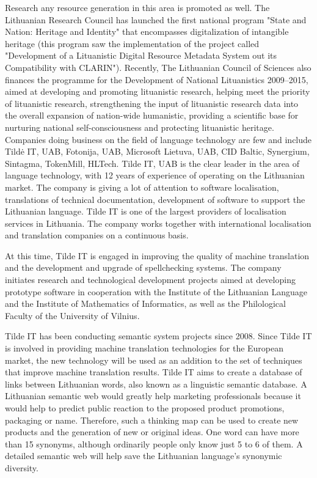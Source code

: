 \documentclass[]{../metanetpaper}
\begin{document}
\begin{multicols}{2}
Research any resource generation in this area is promoted as well. The Lithuanian Research Council has launched the first national program "State and Nation: Heritage and Identity" that encompasses digitalization of intangible heritage (this program saw the implementation of the project called "Development of a Lituanistic Digital Resource Metadata System out its Compatibility with CLARIN"). Recently, The Lithuanian Council of Sciences also finances the programme for the Development of National Lituanistics 2009–2015, aimed at developing and promoting lituanistic research, helping meet the priority of lituanistic research, strengthening the input of lituanistic research data into the overall expansion of nation-wide humanistic, providing a scientific base for nurturing national self-consciousness and protecting lituanistic heritage.
Companies doing business on the field of language technology are few and include Tildė IT, UAB, Fotonija, UAB, Microsoft Lietuva, UAB, CID Baltic, Synergium, Sintagma, TokenMill, HLTech.
Tilde IT, UAB is the clear leader in the area of language technology, with 12 years of experience of operating on the Lithuanian market.
The company is giving a lot of attention to software localisation, translations of technical documentation, development of software to support the Lithuanian language. Tilde IT is one of the largest providers of localisation services in Lithuania. The company works together with international localisation and translation companies on a continuous basis.

    At this time, Tilde IT is engaged in improving the quality of machine translation and the development and upgrade of spellchecking systems. The company initiates research and technological development projects aimed at developing prototype software in cooperation with the Institute of the Lithuanian Language and the Institute of Mathematics of Informatics, as well as the Philological Faculty of the University of Vilnius.

    Tilde IT has been conducting semantic system projects since 2008. Since Tilde IT is involved in providing machine translation technologies for the European market, the new technology will be used as an addition to the set of techniques that improve machine translation results. Tilde IT aims to create a database of links between Lithuanian words, also known as a linguistic semantic database. A Lithuanian semantic web would greatly help marketing professionals because it would help to predict public reaction to the proposed product promotions, packaging or name. Therefore, such a thinking map can be used to create new products and the generation of new or original ideas. One word can have more than 15 synonyms, although ordinarily people only know just 5 to 6 of them. A detailed semantic web will help save the Lithuanian language’s synonymic diversity. 


\end{multicols}
\end{document}
